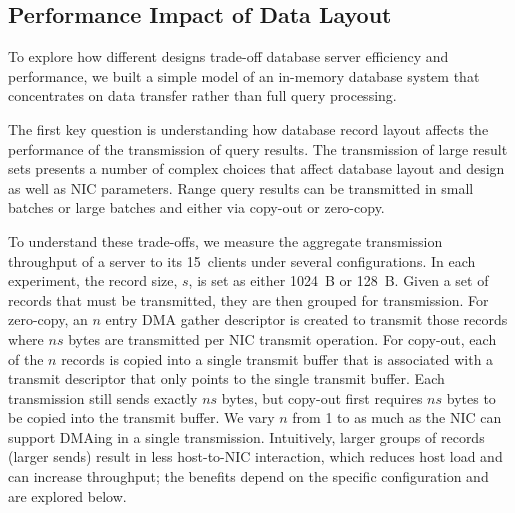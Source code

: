 


\subsection{Performance Impact of Data Layout}
\label{sec:zero-copy-tput}

%
To explore how different designs trade-off database server efficiency and
performance, we built a simple model of an in-memory database system that
concentrates on data transfer rather than full query processing.

The first key question is understanding how database record layout affects the
performance of the transmission of query results.  The transmission of large
result sets presents a number of complex choices that affect
database layout and design as well as NIC parameters.  Range query
results can be transmitted in small batches or large batches and either via
copy-out or zero-copy.

To understand these trade-offs, we measure the aggregate transmission
throughput of a server to its 15~clients under several
configurations.  In each experiment, the record size, $s$, is set as either 1024~B or
128~B. Given a set of records that must be transmitted, they are then grouped
for transmission. For zero-copy, an $n$ entry DMA gather descriptor is created
to transmit those records where $ns$ bytes are transmitted per NIC transmit
operation. For copy-out, each of the $n$ records is copied into a single
transmit buffer that is associated with a transmit descriptor that only points
to the single transmit buffer. Each transmission still sends exactly $ns$
bytes, but copy-out first requires $ns$ bytes to be copied into the transmit buffer.
We vary $n$ from 1 to as much as the NIC can support DMAing in a single transmission.
Intuitively, larger groups of records (larger sends) result in less host-to-NIC
interaction, which reduces host load and can increase throughput; the benefits
depend on the specific configuration and are explored below.

